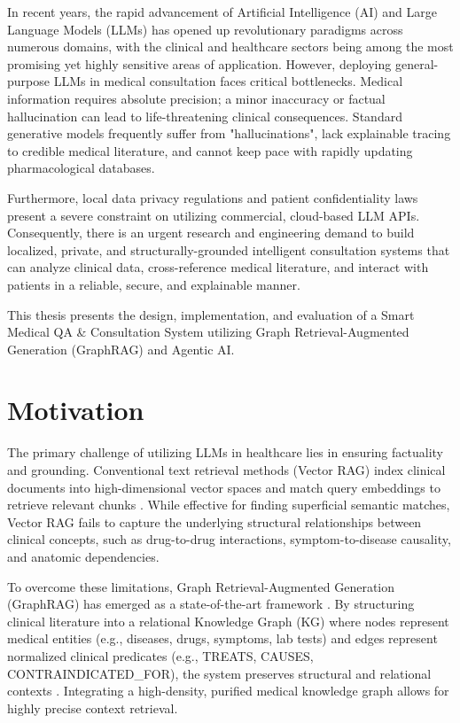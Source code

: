\documentclass[../main.tex]{subfiles}
\begin{document}
In recent years, the rapid advancement of Artificial Intelligence (AI) and Large Language Models (LLMs) has opened up revolutionary paradigms across numerous domains, with the clinical and healthcare sectors being among the most promising yet highly sensitive areas of application. However, deploying general-purpose LLMs in medical consultation faces critical bottlenecks. Medical information requires absolute precision; a minor inaccuracy or factual hallucination can lead to life-threatening clinical consequences. Standard generative models frequently suffer from "hallucinations", lack explainable tracing to credible medical literature, and cannot keep pace with rapidly updating pharmacological databases. 

Furthermore, local data privacy regulations and patient confidentiality laws present a severe constraint on utilizing commercial, cloud-based LLM APIs. Consequently, there is an urgent research and engineering demand to build localized, private, and structurally-grounded intelligent consultation systems that can analyze clinical data, cross-reference medical literature, and interact with patients in a reliable, secure, and explainable manner.

This thesis presents the design, implementation, and evaluation of a Smart Medical QA \& Consultation System utilizing Graph Retrieval-Augmented Generation (GraphRAG) and Agentic AI. 

\section{Motivation}
\label{section:1.1}
The primary challenge of utilizing LLMs in healthcare lies in ensuring factuality and grounding. Conventional text retrieval methods (Vector RAG) index clinical documents into high-dimensional vector spaces and match query embeddings to retrieve relevant chunks \cite{lewis2020retrieval}. While effective for finding superficial semantic matches, Vector RAG fails to capture the underlying structural relationships between clinical concepts, such as drug-to-drug interactions, symptom-to-disease causality, and anatomic dependencies. 

To overcome these limitations, Graph Retrieval-Augmented Generation (GraphRAG) has emerged as a state-of-the-art framework \cite{edge2024from}. By structuring clinical literature into a relational Knowledge Graph (KG) where nodes represent medical entities (e.g., diseases, drugs, symptoms, lab tests) and edges represent normalized clinical predicates (e.g., TREATS, CAUSES, CONTRAINDICATED\_FOR), the system preserves structural and relational contexts \cite{robinson2015graph}. Integrating a high-density, purified medical knowledge graph allows for highly precise context retrieval. 
\end{document}
